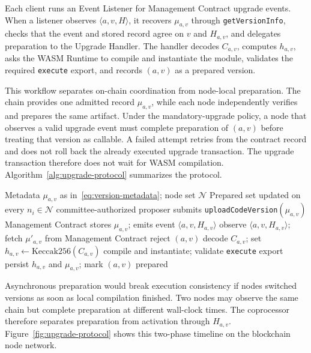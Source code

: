 \documentclass[pdflatex,sn-mathphys-num]{sn-jnl}%
\theoremstyle{thmstyleone}%
\theoremstyle{thmstyletwo}%
\theoremstyle{thmstylethree}%
\begin{document}
Each client runs an Event Listener for Management Contract upgrade events. When a listener observes $\langle a,v,H\rangle$, it recovers $\mu_{a,v}$ through \texttt{getVersionInfo}, checks that the event and stored record agree on $v$ and $H_{a,v}$, and delegates preparation to the Upgrade Handler. The handler decodes $C_{a,v}$, computes $h_{a,v}$, asks the WASM Runtime to compile and instantiate the module, validates the required \texttt{execute} export, and records $(a,v)$ as a prepared version.

This workflow separates on-chain coordination from node-local preparation. The chain provides one admitted record $\mu_{a,v}$, while each node independently verifies and prepares the same artifact. Under the mandatory-upgrade policy, a node that observes a valid upgrade event must complete preparation of $(a,v)$ before treating that version as callable. A failed attempt retries from the contract record and does not roll back the already executed upgrade transaction. The upgrade transaction therefore does not wait for WASM compilation. Algorithm~\ref{alg:upgrade-protocol} summarizes the protocol.

\begin{algorithm}[!tb]
\caption{\textbf{Activation-Block-based WASM upgrade protocol.}}
\label{alg:upgrade-protocol}
\begin{algorithmic}[1]
\Require Metadata $\mu_{a,v}$ as in~\eqref{eq:version-metadata}; node set $\mathcal{N}$
\Ensure Prepared set updated on every $n_i\in\mathcal{N}$
\State committee-authorized proposer submits \texttt{uploadCodeVersion}$(\mu_{a,v})$
\State Management Contract stores $\mu_{a,v}$; emits event $\langle a,v,H_{a,v}\rangle$
    \State observe $\langle a,v,H_{a,v}\rangle$; fetch $\mu'_{a,v}$ from Management Contract
        \State reject $(a,v)$
    \Else
        \State decode $C_{a,v}$; set $h_{a,v}\gets\mathrm{Keccak256}(C_{a,v})$
        \Repeat
            \State compile and instantiate; validate \texttt{execute} export
        \State persist $h_{a,v}$ and $\mu_{a,v}$; mark $(a,v)$ prepared
    \EndIf
\EndFor
\end{algorithmic}
\end{algorithm}

Asynchronous preparation would break execution consistency if nodes switched versions as soon as local compilation finished. Two nodes may observe the same chain but complete preparation at different wall-clock times. The coprocessor therefore separates preparation from activation through $H_{a,v}$. Figure~\ref{fig:upgrade-protocol} shows this two-phase timeline on the blockchain node network.
\end{document}
